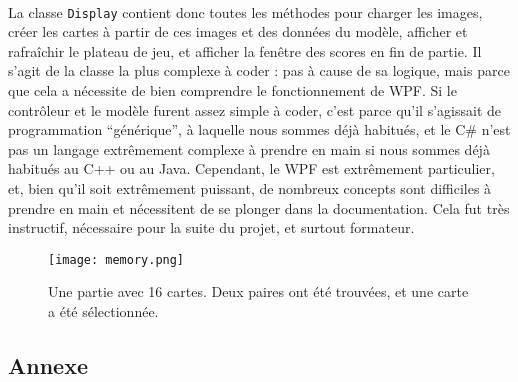 \paragraph{}La classe \lstinline|Display| contient donc toutes les méthodes pour charger les images, créer les cartes à partir de ces images et des données du modèle, afficher et rafraîchir le plateau de jeu, et afficher la fenêtre des scores en fin de partie. Il s'agit de la classe la plus complexe à coder : pas à cause de sa logique, mais parce que cela a nécessite de bien comprendre le fonctionnement de WPF. Si le contrôleur et le modèle furent assez simple à coder, c'est parce qu'il s'agissait de programmation \enquote{générique}, à laquelle nous sommes déjà habitués, et le C\# n'est pas un langage extrêmement complexe à prendre en main si nous sommes déjà habitués au C++ ou au Java. Cependant, le WPF est extrêmement particulier, et, bien qu'il soit extrêmement puissant, de nombreux concepts sont difficiles à prendre en main et nécessitent de se plonger dans la documentation. Cela fut très instructif, nécessaire pour la suite du projet, et surtout formateur. 


\begin{figure}[H]
	\centering
	\texttt{[image: memory.png]}
	\caption{Une partie avec 16 cartes. Deux paires ont été trouvées, et une carte a été sélectionnée.}
	\label{fig:memory}
\end{figure}

\subsection{Annexe}
\label{sec:memory_annexe}


\vspace{2cm}

\vspace{2cm}

\vspace{2cm}

